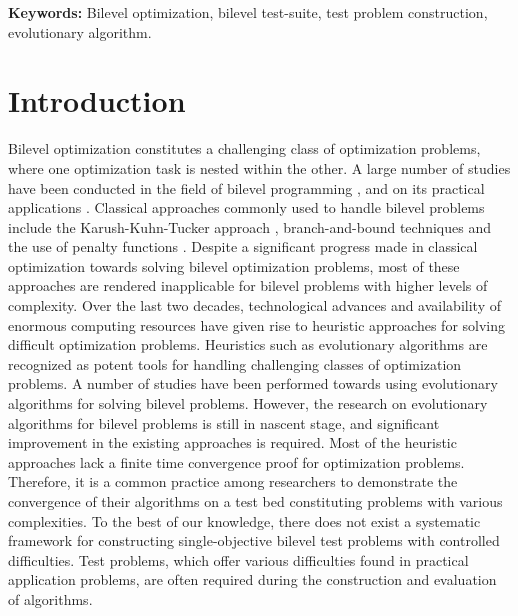 \documentclass[twoside]{article}
\begin{document}
{\bf Keywords:}
Bilevel optimization,
bilevel test-suite,
test problem construction,
evolutionary algorithm.


\section{Introduction}
Bilevel optimization constitutes a challenging class of optimization problems, where one optimization task is nested within the other. A large number of studies have been conducted in the field of bilevel programming \citep{colson,vicente-review,dempe-dutta,my-ecj10}, and on its practical applications \citep{dempe02}. Classical approaches commonly used to handle bilevel problems include the Karush-Kuhn-Tucker approach \citep{bianco-kkt,bilevel-KKT1}, branch-and-bound techniques \citep{bard82} and the use of penalty functions \citep{aiyoshi81}. Despite a significant progress made in classical optimization towards solving bilevel optimization problems, most of these approaches are rendered inapplicable for bilevel problems with higher levels of complexity. Over the last two decades, technological advances and availability of enormous computing resources have given rise to heuristic approaches for solving difficult optimization problems. Heuristics such as evolutionary algorithms are recognized as potent tools for handling challenging classes of optimization problems. A number of studies have been performed towards using evolutionary algorithms \citep{yin-bilevel,GA_Wang,my-ecj10} for solving bilevel problems. However, the research on evolutionary algorithms for bilevel problems is still in nascent stage, and significant improvement in the existing approaches is required. Most of the heuristic approaches lack a finite time convergence proof for optimization problems. Therefore, it is a common practice among researchers to demonstrate the convergence of their algorithms on a test bed constituting problems with various complexities. To the best of our knowledge, there does not exist a systematic framework for constructing single-objective bilevel test problems with controlled difficulties. Test problems, which offer various difficulties found in practical application problems, are often required during the construction and evaluation of algorithms.
\end{document}
